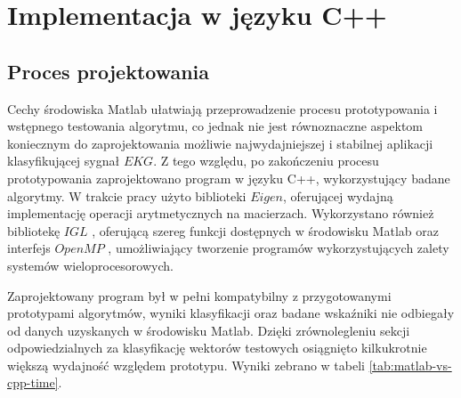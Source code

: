 \section{Implementacja w języku C++}
\subsection{Proces projektowania}
Cechy środowiska Matlab ułatwiają przeprowadzenie procesu prototypowania i wstępnego testowania algorytmu, co jednak nie jest równoznaczne aspektom koniecznym do zaprojektowania możliwie najwydajniejszej i stabilnej aplikacji klasyfikującej sygnał $EKG$. Z tego względu, po zakończeniu procesu prototypowania zaprojektowano program w języku C++, wykorzystujący badane algorytmy. W trakcie pracy użyto biblioteki $Eigen$, oferującej wydajną implementację operacji arytmetycznych na macierzach. Wykorzystano również bibliotekę $IGL$ \cite{libigl-www}, oferującą szereg funkcji dostępnych w środowisku Matlab oraz interfejs $OpenMP$ \cite{openmp-www}, umożliwiający tworzenie programów wykorzystujących zalety systemów wieloprocesorowych.

Zaprojektowany program był w pełni kompatybilny z przygotowanymi prototypami algorytmów, wyniki klasyfikacji oraz badane wskaźniki nie odbiegały od danych uzyskanych w środowisku Matlab. Dzięki zrównolegleniu sekcji odpowiedzialnych za klasyfikację wektorów testowych osiągnięto kilkukrotnie większą wydajność względem prototypu. Wyniki zebrano w tabeli \ref{tab:matlab-vs-cpp-time}.


